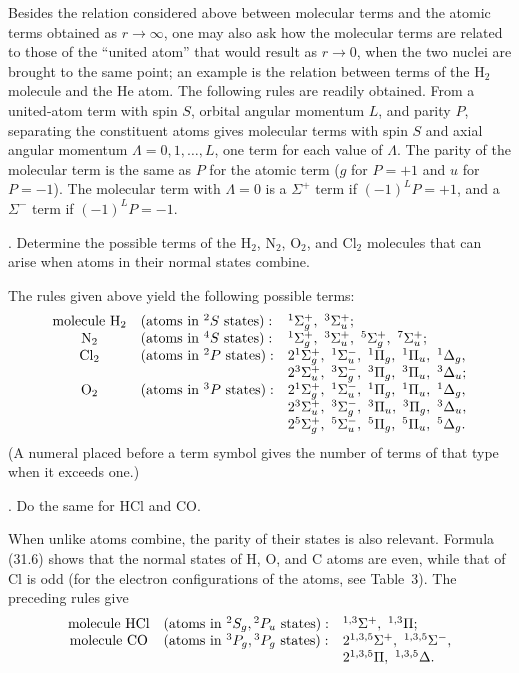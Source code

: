 Besides the relation considered above between molecular terms and the atomic terms obtained as $r\to\infty$, one may also ask how the molecular terms are related to those of the ``united atom'' that would result as $r\to0$, when the two nuclei are brought to the same point; an example is the relation between terms of the $\mathrm H_2$ molecule and the He atom. The following rules are readily obtained. From a united-atom term with spin $S$, orbital angular momentum $L$, and parity $P$, separating the constituent atoms gives molecular terms with spin $S$ and axial angular momentum $\Lambda=0,1,\ldots,L$, one term for each value of $\Lambda$. The parity of the molecular term is the same as $P$ for the atomic term ($g$ for $P=+1$ and $u$ for $P=-1$). The molecular term with $\Lambda=0$ is a $\Sigma^+$ term if $(-1)^LP=+1$, and a $\Sigma^-$ term if $(-1)^LP=-1$.

. Determine the possible terms of the $\mathrm H_2$, $\mathrm N_2$, $\mathrm O_2$, and $\mathrm{Cl}_2$ molecules that can arise when atoms in their normal states combine.

\SolutionHeading The rules given above yield the following possible terms:
\[
\begin{array}{c@{\quad}l@{\quad}l}
\text{molecule }\mathrm H_2& (\text{atoms in }{}^2S\text{ states}):&{}^1\Sigma_g^+,\ {}^3\Sigma_u^+;\\
\mathrm N_2&(\text{atoms in }{}^4S\text{ states}):&{}^1\Sigma_g^+,\ {}^3\Sigma_u^+,\ {}^5\Sigma_g^+,\ {}^7\Sigma_u^+;\\
\mathrm{Cl}_2&(\text{atoms in }{}^2P\text{ states}):&2{}^1\Sigma_g^+,\ {}^1\Sigma_u^-,\ {}^1\Pi_g,\ {}^1\Pi_u,\ {}^1\Delta_g,\\
&&2{}^3\Sigma_u^+,\ {}^3\Sigma_g^-,\ {}^3\Pi_g,\ {}^3\Pi_u,\ {}^3\Delta_u;\\
\mathrm O_2&(\text{atoms in }{}^3P\text{ states}):&2{}^1\Sigma_g^+,\ {}^1\Sigma_u^-,\ {}^1\Pi_g,\ {}^1\Pi_u,\ {}^1\Delta_g,\\
&&2{}^3\Sigma_u^+,\ {}^3\Sigma_g^-,\ {}^3\Pi_u,\ {}^3\Pi_g,\ {}^3\Delta_u,\\
&&2{}^5\Sigma_g^+,\ {}^5\Sigma_u^-,\ {}^5\Pi_g,\ {}^5\Pi_u,\ {}^5\Delta_g.
\end{array}
\]
(A numeral placed before a term symbol gives the number of terms of that type when it exceeds one.)

. Do the same for HCl and CO.

\SolutionHeading When unlike atoms combine, the parity of their states is also relevant. Formula (31.6) shows that the normal states of H, O, and C atoms are even, while that of Cl is odd (for the electron configurations of the atoms, see Table~3). The preceding rules give
\[
\begin{array}{c@{\quad}l@{\quad}l}
\text{molecule HCl}&(\text{atoms in }{}^2S_g,{}^2P_u\text{ states}):&{}^{1,3}\Sigma^+,\ {}^{1,3}\Pi;\\
\text{molecule CO}&(\text{atoms in }{}^3P_g,{}^3P_g\text{ states}):&2{}^{1,3,5}\Sigma^+,\ {}^{1,3,5}\Sigma^-,\\
&&2{}^{1,3,5}\Pi,\ {}^{1,3,5}\Delta.
\end{array}
\]
